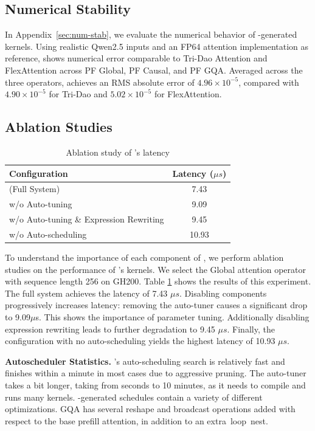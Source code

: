 
\subsection{Numerical Stability}
In Appendix~\ref{sec:num-stab}, we evaluate the numerical behavior of \NAME{}-generated kernels.
Using realistic Qwen2.5 inputs and an FP64 attention implementation as reference, \NAME{} shows numerical error comparable to Tri-Dao Attention and FlexAttention across PF Global, PF Causal, and PF GQA.
Averaged across the three operators, \NAME{} achieves an RMS absolute error of $4.96\times 10^{-5}$, compared with $4.90\times 10^{-5}$ for Tri-Dao and $5.02\times 10^{-5}$ for FlexAttention.



\subsection{Ablation Studies}

\begin{table}[t]
  \centering
  \caption{Ablation study of \NAME{}'s latency}
  \label{tab:ablation}
  \begin{tabular}{lc}
    \toprule
    \textbf{Configuration} & \textbf{Latency ($\mu s$)} \\
    \midrule
    \NAME{} (Full System) & 7.43 \\
    w/o Auto-tuning & 9.09 \\
    w/o Auto-tuning \& Expression Rewriting & 9.45 \\
    w/o Auto-scheduling & 10.93 \\
    \bottomrule
  \end{tabular}
\end{table}

To understand the importance of each component of \NAME{},
we perform ablation studies on the performance of \NAME{}'s kernels.
We select the Global attention operator with sequence length 256 on GH200.
Table \ref{tab:ablation} shows the results of this experiment.
The full \NAME{} system achieves the latency of 7.43 $\mu s$.
Disabling components progressively increases latency: removing the auto-tuner causes a
significant drop to 9.09$\mu$s. This shows the importance of parameter tuning.
Additionally disabling expression rewriting leads to further degradation to 9.45 $\mu s$.
Finally, the configuration with no auto-scheduling yields the highest latency of 10.93 $\mu s$.

\noindent\textbf{Autoscheduler Statistics.} \NAME{}'s auto-scheduling search is
relatively fast and finishes within a minute in most cases due to aggressive pruning. 
The auto-tuner takes a bit longer, taking from seconds to 10
minutes, as it needs to compile and runs many kernels.
\NAME-generated schedules contain a variety of different optimizations. GQA has several
reshape and broadcast operations added with respect to the base prefill attention, in
addition to an \mbox{extra loop nest.}
